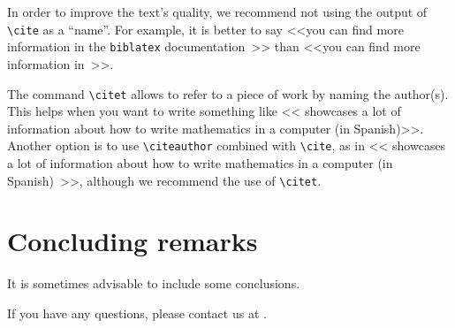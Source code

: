 \documentclass[babel-main=english]{TEMat-article}
\begin{document}
\begin{remark}
In order to improve the text's quality, we recommend not using the output of \verb+\cite+ as a ``name''.
For example, it is better to say <<you can find more information in the \texttt{biblatex} documentation~\cite{biblatex}>> than <<you can find more information in~\cite{biblatex}>>.

The command \verb+\citet+ allows to refer to a piece of work by naming the author(s).
This helps when you want to write something like <<\citet{bezosOM} showcases a lot of information about how to write mathematics in a computer (in Spanish)>>. Another option is to use \verb+\citeauthor+ combined with \verb+\cite+, as in <<\citeauthor{bezosOM} showcases a lot of information about how to write mathematics in a computer (in Spanish)~\cite{bezosOM}>>, although we recommend the use of \verb+\citet+.
\end{remark}

\section{Concluding remarks}

It is sometimes advisable to include some conclusions.

If you have any questions, please contact us at .

\nocite{*}
\printbibliography[heading=bibintoc]
\end{document}
